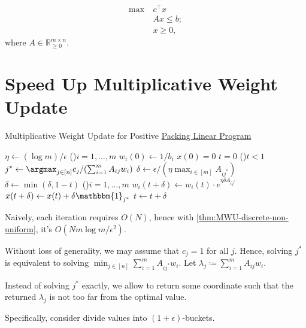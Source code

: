 
\[
	\begin{aligned}
		\max~ & c^{\top} x  \\
		      & Ax \leq b ; \\
		      & x \geq 0,
	\end{aligned}
\]
where \(A \in \mathbb{R} _{\geq 0}^{m \times n}\).

\section{Speed Up Multiplicative Weight Update}
\begin{algorithm}[H]\label{algo:MWU-discrete-linear}
	\DontPrintSemicolon{}
	\caption{Multiplicative Weight Update for Positive \hyperref[def:packing-LP]{Packing Linear Program}}
	\BlankLine

	\(\eta \gets (\log m) / \epsilon \)\;
	\For(){\(i = 1, \dots , m\)}{
		\(w_i(0) \gets 1 / b_i\)\;
	}
	\(x(0) = 0\)
	\(t = 0\)\;
	\;
	\While(){\(t < 1\)}{
	\(j^{\ast} \gets \argmax_{j \in [n]} c_j / (\sum_{i=1}^{m} A_{ij} w_i)\)\;
	\(\delta \gets \epsilon / (\eta \max _{i \in [m]} A_{ij^{\ast} })\)
	\(\delta \gets \min (\delta , 1 - t)\)
	\For(){\(i = 1, \dots , m\)}{
		\(w_i(t+\delta ) \gets w_i(t) \cdot e^{\eta \delta A_{ij^{\ast} }}\)\;
	}
	\(x (t+\delta ) \gets x (t) + \delta \mathbbm{1}_{j^{\ast} }\)\;
	\(t \gets t + \delta \)\;
	}
	\;
\end{algorithm}

Naively, each iteration requires \(O(N)\), hence with \autoref{thm:MWU-discrete-non-uniform}, it's \(O(N m \log m / \epsilon ^2)\).

Without loss of generality, we may assume that \(c_j = 1\) for all \(j\). Hence, solving \(j^{\ast} \) is equivalent to solving \(\min _{j \in [n]} \sum_{i=1}^{m} A_{ij^{\ast} } w_i\). Let \(\lambda _j \coloneqq \sum_{i=1}^{m} A_{ij} w_i\).

\begin{intuition}
	Instead of solving \(j^{\ast} \) exactly, we allow to return some coordinate such that the returned \(\lambda _j\) is not too far from the optimal value.
\end{intuition}

Specifically, consider divide values into \((1 + \epsilon )\)-buckets.

